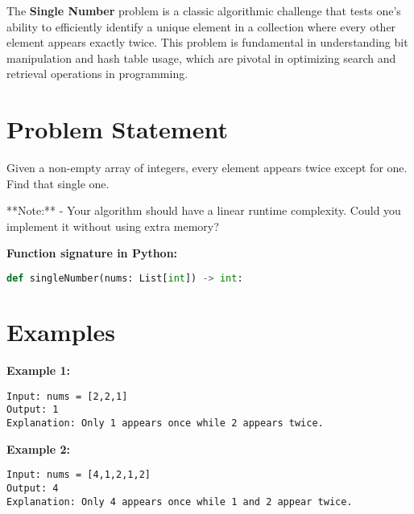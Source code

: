 
\label{chap:Single_Number}

The \textbf{Single Number} problem is a classic algorithmic challenge that tests one's ability to efficiently identify a unique element in a collection where every other element appears exactly twice. This problem is fundamental in understanding bit manipulation and hash table usage, which are pivotal in optimizing search and retrieval operations in programming.

\section*{Problem Statement}

Given a non-empty array of integers, every element appears twice except for one. Find that single one.

**Note:**
- Your algorithm should have a linear runtime complexity. Could you implement it without using extra memory?

\textbf{Function signature in Python:}
\begin{lstlisting}[language=Python]
def singleNumber(nums: List[int]) -> int:
\end{lstlisting}

\section*{Examples}

\textbf{Example 1:}

\begin{verbatim}
Input: nums = [2,2,1]
Output: 1
Explanation: Only 1 appears once while 2 appears twice.
\end{verbatim}

\textbf{Example 2:}

\begin{verbatim}
Input: nums = [4,1,2,1,2]
Output: 4
Explanation: Only 4 appears once while 1 and 2 appear twice.
\end{verbatim}

